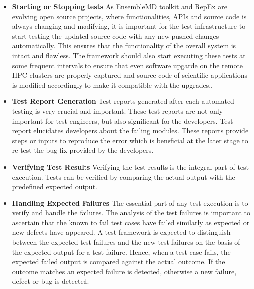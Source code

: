 \documentclass[10pt]{ruthesis}
\begin{document}
\begin{itemize}

\item \textbf{Starting or Stopping tests}\newline
As EnsembleMD toolkit and RepEx are evolving open source projects, where functionalities, APIs and source code is always changing and modifying, it is important for the test infrastructure to start testing the updated source code with any new pushed changes automatically. This ensures that the functionality of the overall system is intact and flawless. The framework should also start executing these tests at some frequent intervals to ensure that even software upgarde on the remote HPC clusters are properly captured and source code of scientific applications is modified accordingly to make it compatible with the upgrades..

\item \textbf{Test Report Generation}\newline
Test reports generated after each automated testing is very crucial and important. These test reports are not only important for test engineers, but also significant for the developers. Test report elucidates developers about the failing modules. These reports provide steps or inputs to reproduce the error which is beneficial at the later stage to re-test the bug-fix provided by the developers. 

\item \textbf{Verifying Test Results}\newline
Verifying the test results is the integral part of test execution. Tests can be verified by comparing the actual output with the predefined expected output.

\item \textbf{Handling Expected Failures}\newline
The essential part of any test execution is to verify and handle the failures. The analysis of the test failures is important to ascertain that the known to fail test cases have failed similarly as expected or new defects have appeared. A test framework is expected to distinguish between the expected test failures and the new test failures on the basis of the expected output for a test failure. Hence, when a test case fails, the expected failed output is compared against the actual outcome. If the outcome matches an expected failure is detected, otherwise a new failure, defect or bug is detected. 

\end{itemize}
\end{document}
